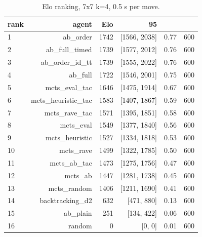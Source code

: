 \begin{table}[ht]
\centering
\begin{tabular}{lrrrrr}
\toprule
rank & agent & Elo & 95\\%
\midrule
1 & ab\_order & 1742 & [1566, 2038] & 0.77 & 600 \\
2 & ab\_full\_timed & 1739 & [1577, 2012] & 0.76 & 600 \\
3 & ab\_order\_id\_tt & 1739 & [1555, 2022] & 0.76 & 600 \\
4 & ab\_full & 1722 & [1546, 2001] & 0.75 & 600 \\
5 & mcts\_eval\_tac & 1646 & [1475, 1914] & 0.67 & 600 \\
6 & mcts\_heuristic\_tac & 1583 & [1407, 1867] & 0.59 & 600 \\
7 & mcts\_rave\_tac & 1571 & [1395, 1851] & 0.58 & 600 \\
8 & mcts\_eval & 1549 & [1377, 1840] & 0.56 & 600 \\
9 & mcts\_heuristic & 1527 & [1334, 1818] & 0.53 & 600 \\
10 & mcts\_rave & 1499 & [1322, 1785] & 0.50 & 600 \\
11 & mcts\_ab\_tac & 1473 & [1275, 1756] & 0.47 & 600 \\
12 & mcts\_ab & 1447 & [1281, 1738] & 0.45 & 600 \\
13 & mcts\_random & 1406 & [1211, 1690] & 0.41 & 600 \\
14 & backtracking\_d2 & 632 & [471, 880] & 0.13 & 600 \\
15 & ab\_plain & 251 & [134, 422] & 0.06 & 600 \\
16 & random & 0 & [0, 0] & 0.01 & 600 \\
\bottomrule
\end{tabular}
\caption{Elo ranking, 7x7 k=4, 0.5 s per move.}
\label{tab:elo-7x4}
\end{table}

